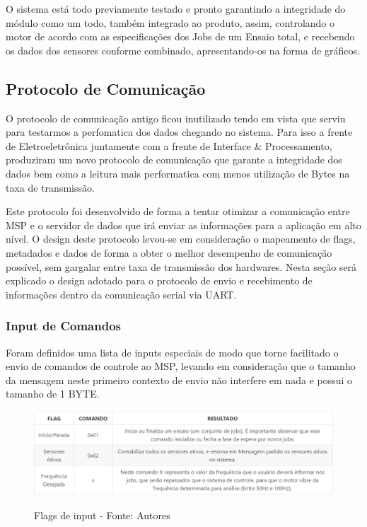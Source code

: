 O sistema está todo previamente testado e pronto garantindo a integridade do módulo como um todo, também integrado ao produto, assim, controlando o motor de acordo com as especificações dos Jobs de um Ensaio total, e recebendo os dados dos sensores conforme combinado, apresentando-os na forma de gráficos.

\subsection{Protocolo de Comunicação}

O protocolo de comunicação antigo ficou inutilizado tendo em vista que serviu para testarmos a perfomatica dos dados chegando no sistema. Para isso a frente de Eletroeletrônica juntamente com a frente de Interface \& Processamento, produziram um novo protocolo de comunicação que garante a integridade dos dados bem como a leitura mais performatica com menos utilização de Bytes na taxa de transmissão.

Este protocolo foi desenvolvido de forma a tentar otimizar a comunicação entre MSP e o servidor de dados que irá enviar as informações para a aplicação em alto nível. O design deste protocolo levou-se em consideração o mapeamento de flags, metadados e dados de forma a obter o melhor desempenho de comunicação possível, sem gargalar entre taxa de transmissão dos hardwares. Nesta seção será explicado o design adotado para o protocolo de envio e recebimento de informações dentro da comunicação serial via UART.

\subsubsection*{Input de Comandos}

Foram definidos uma lista de inputs especiais de modo que torne facilitado o envio de comandos de controle ao MSP, levando em consideração que o tamanho da mensagem neste primeiro contexto de envio não interfere em nada e possui o tamanho de 1 BYTE.

\begin{figure}[H]
\centering
\includegraphics[keepaspectratio=true,scale=0.75]{figuras/flags_input.png}
\label{fig:flags_input}
\caption{Flags de input - Fonte: Autores}
\end{figure}


